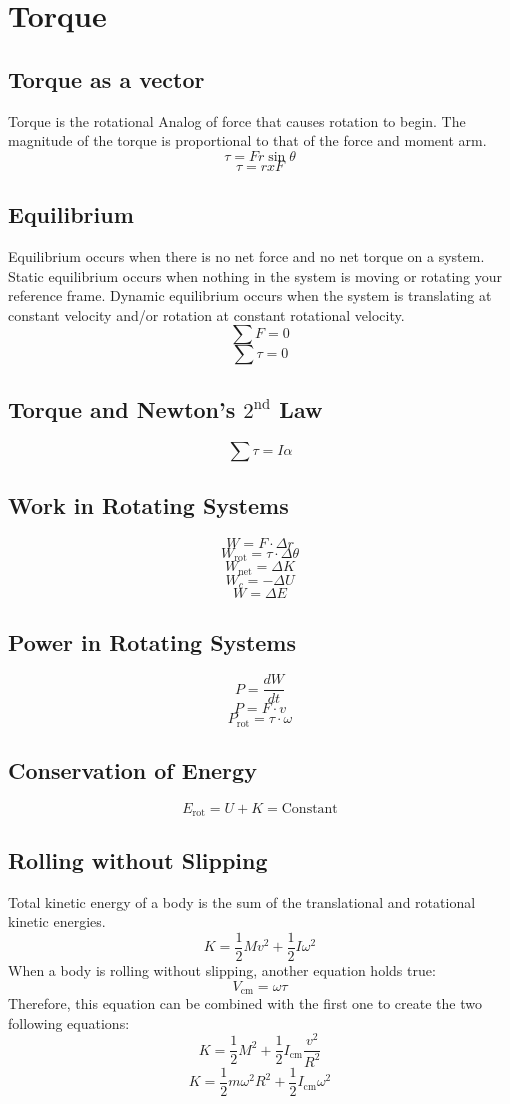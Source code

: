 \section{Torque}

\subsection{Torque as a vector}
Torque is the rotational Analog of force that causes rotation to begin. The magnitude of the torque is proportional to that of the force and moment arm.
\[\tau = Fr \sin \theta\]
\[\tau = r x F\]


\subsection{Equilibrium}
Equilibrium occurs when there is no net force and no net torque on a system. Static equilibrium occurs when nothing in the system is moving or rotating your reference frame. Dynamic equilibrium occurs when the system is translating at constant velocity and/or rotation at constant rotational velocity.
\[\sum F=0\]
\[\sum \tau = 0\]

\subsection{Torque and Newton's $2^{\text{nd}}$ Law}
\[\sum\tau=I\alpha\]



\subsection{Work in Rotating Systems}
\[W=F\cdot \Delta r\]
\[W_{\text{rot}}=\tau\cdot\Delta\theta\]
\[W_{\text{net}} = \Delta K\]
\[W_c=-\Delta U\]
\[W=\Delta E\]

\subsection{Power in Rotating Systems}
\[P=\frac{dW}{dt}\]
\[P=F\cdot v\]
\[P_{\text{rot}}=\tau\cdot\omega\]

\subsection{Conservation of Energy}
\[E_{\text{rot}} = U+K=\text{Constant}\]


\subsection{Rolling without Slipping}
Total kinetic energy of a body is the sum of the translational and rotational kinetic energies.
\[K=\frac{1}{2}Mv^2+\frac{1}{2}I\omega^2\]
When a body is rolling without slipping, another equation holds true:
\[V_{\text{cm}}=\omega\tau\]
Therefore, this equation can be combined with the first one to create the two following equations:
\[K=\frac{1}{2}M^2+\frac{1}{2}I_{\text{cm}}\frac{v^2}{R^2}\]
\[K=\frac{1}{2}m\omega^2 R^2+\frac{1}{2}I_{\text{cm}}\omega^2\]